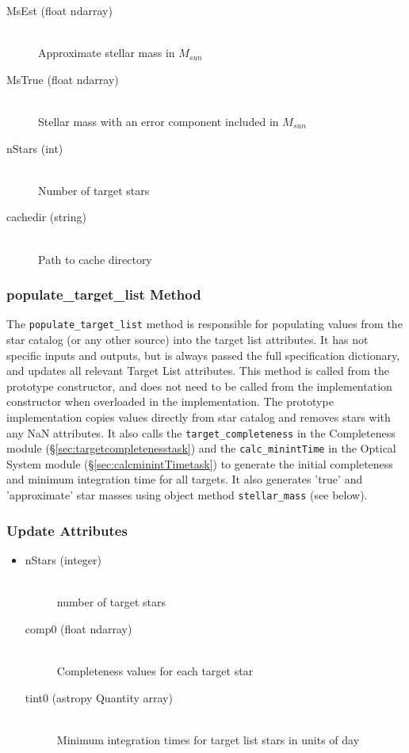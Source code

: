 \documentclass[cleanfoot]{asme2ej}
\begin{document}
\begin{itemize}
\begin{description}
    \item[MsEst (float ndarray)] \hfill \\ Approximate stellar mass in $ M_{sun} $
    \item[MsTrue (float ndarray)] \hfill \\ Stellar mass with an error component included in $ M_{sun} $
    \item[nStars (int)] \hfill \\ Number of target stars
    \item[cachedir (string)] \hfill \\ Path to cache directory
\end{description}
\end{itemize}

\subsubsection{populate\_target\_list Method} \label{sec:populatetargetlisttask}
The \verb+populate_target_list+ method is responsible for populating values from the star catalog  (or any other source) into the target list attributes. It has not specific inputs and outputs, but is always passed the full specification dictionary, and updates all relevant Target List attributes.  This method is called from the prototype constructor, and does not need to be called from the implementation constructor when overloaded in the implementation.   The prototype implementation copies values directly from star catalog and removes stars with any NaN attributes. It also calls the \verb+target_completeness+ in the Completeness module (\S\ref{sec:targetcompletenesstask}) and the \verb+calc_minintTime+ in the Optical System module (\S\ref{sec:calcminintTimetask}) to generate the initial completeness and minimum integration time for all targets.  It also generates 'true' and 'approximate' star masses using object method \verb+stellar_mass+ (see below).
\subsubsection*{Update Attributes}
\begin{itemize}
\item
\begin{description}
    \item[nStars (integer)] \hfill \\ number of target stars
    \item[comp0 (float ndarray)] \hfill \\ Completeness values for each target star
    \item[tint0 (astropy Quantity array)] \hfill \\ Minimum integration times for target list stars in units of day
\end{description}
\end{itemize}
\end{document}
